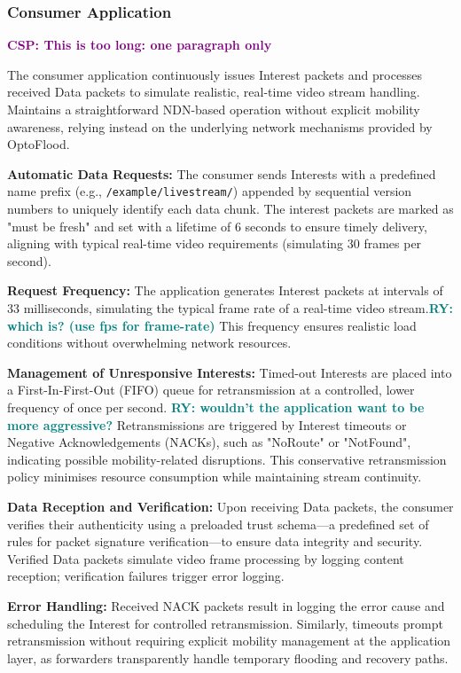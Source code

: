 \documentclass[10pt,conference]{IEEEtran}
\newcommand{\csp}[1]{\textbf{\textcolor{purple}{CSP: #1}}}
\newcommand{\ryo}[1]{\textbf{\textcolor{teal}{RY: #1}}}
\begin{document}
\subsubsection{Consumer Application}

\csp{This is too long: one paragraph only}

The consumer application continuously issues Interest packets and processes received Data packets to simulate realistic, real-time video stream handling. Maintains a straightforward NDN-based operation without explicit mobility awareness, relying instead on the underlying network mechanisms provided by OptoFlood.

\textbf{Automatic Data Requests:}
The consumer sends Interests with a predefined name prefix (e.g., \texttt{/example/livestream/}) appended by sequential version numbers to uniquely identify each data chunk. The interest packets are marked as "must be fresh" and set with a lifetime of 6 seconds to ensure timely delivery, aligning with typical real-time video requirements (simulating 30 frames per second).

\textbf{Request Frequency:}
The application generates Interest packets at intervals of 33 milliseconds, simulating the typical frame rate of a real-time video stream.\ryo{which is? (use fps for frame-rate)} This frequency ensures realistic load conditions without overwhelming network resources.

\textbf{Management of Unresponsive Interests:}
Timed-out Interests are placed into a First-In-First-Out (FIFO) queue for retransmission at a controlled, lower frequency of once per second. \ryo{wouldn't the application want to be more aggressive?} Retransmissions are triggered by Interest timeouts or Negative Acknowledgements (NACKs), such as "NoRoute" or "NotFound", indicating possible mobility-related disruptions. This conservative retransmission policy minimises resource consumption while maintaining stream continuity.

\textbf{Data Reception and Verification:}
Upon receiving Data packets, the consumer verifies their authenticity using a preloaded trust schema—a predefined set of rules for packet signature verification—to ensure data integrity and security. Verified Data packets simulate video frame processing by logging content reception; verification failures trigger error logging.

\textbf{Error Handling:}
Received NACK packets result in logging the error cause and scheduling the Interest for controlled retransmission. Similarly, timeouts prompt retransmission without requiring explicit mobility management at the application layer, as forwarders transparently handle temporary flooding and recovery paths.
\end{document}
